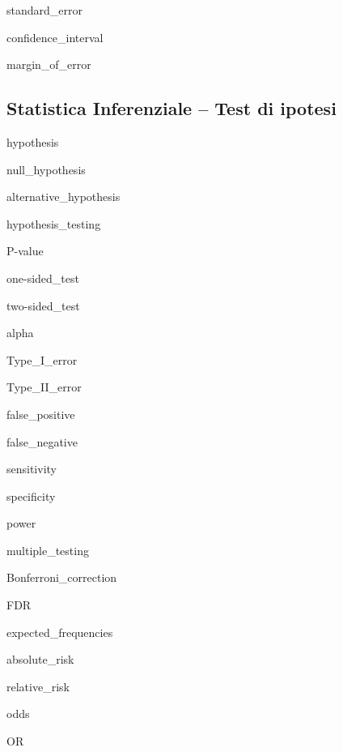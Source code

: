 \documentclass{report}
\begin{document}
\noindent \gls{standard_error}

\noindent \gls{confidence_interval}

\noindent \gls{margin_of_error}


\subsection*{Statistica Inferenziale -- Test di ipotesi}

\noindent \gls{hypothesis}

\noindent \gls{null_hypothesis}

\noindent \gls{alternative_hypothesis}

\noindent \gls{hypothesis_testing}

\noindent \gls{P-value}

\noindent \gls{one-sided_test}

\noindent \gls{two-sided_test}

\noindent \gls{alpha}

\noindent \gls{Type_I_error}

\noindent \gls{Type_II_error}

\noindent \gls{false_positive}

\noindent \gls{false_negative}

\noindent \gls{sensitivity}

\noindent \gls{specificity}

\noindent \gls{power}

\noindent \gls{multiple_testing}

\noindent \gls{Bonferroni_correction}

\noindent \gls{FDR}

\noindent \gls{expected_frequencies}

\noindent \gls{absolute_risk}

\noindent \gls{relative_risk}

\noindent \gls{odds}

\noindent \gls{OR}
\end{document}
